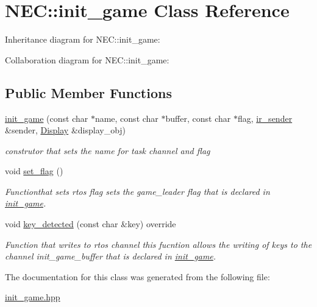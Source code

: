\hypertarget{classNEC_1_1init__game}{}\section{N\+EC\+:\+:init\+\_\+game Class Reference}
\label{classNEC_1_1init__game}


Inheritance diagram for N\+EC\+:\+:init\+\_\+game\+:


Collaboration diagram for N\+EC\+:\+:init\+\_\+game\+:
\subsection*{Public Member Functions}
\begin{DoxyCompactItemize}
\item 
\mbox{\label{classNEC_1_1init__game_ace52a0caaa9e8c08ae366183a1b3769e}} 
\hyperlink{classNEC_1_1init__game_ace52a0caaa9e8c08ae366183a1b3769e}{init\+\_\+game} (const char $\ast$name, const char $\ast$buffer, const char $\ast$flag, \hyperlink{classir__sender}{ir\+\_\+sender} \&sender, \hyperlink{classNEC_1_1Display}{Display} \&display\+\_\+obj)
\begin{DoxyCompactList}\small\item\em construtor that sets the name for task channel and flag \end{DoxyCompactList}\item 
\mbox{\label{classNEC_1_1init__game_a2ebec8672c32804fc405cd051c6d3a95}} 
void \hyperlink{classNEC_1_1init__game_a2ebec8672c32804fc405cd051c6d3a95}{set\+\_\+flag} ()
\begin{DoxyCompactList}\small\item\em Functionthat sets rtos flag  sets the game\+\_\+leader flag that is declared in \hyperlink{classNEC_1_1init__game}{init\+\_\+game}. \end{DoxyCompactList}\item 
\mbox{\label{classNEC_1_1init__game_aed110e01b7119b6b8327650d3efecf95}} 
void \hyperlink{classNEC_1_1init__game_aed110e01b7119b6b8327650d3efecf95}{key\+\_\+detected} (const char \&key) override
\begin{DoxyCompactList}\small\item\em Function that writes to rtos channel  this fucntion allows the writing of keys to the channel init\+\_\+game\+\_\+buffer that is declared in \hyperlink{classNEC_1_1init__game}{init\+\_\+game}. \end{DoxyCompactList}\end{DoxyCompactItemize}


The documentation for this class was generated from the following file\+:\begin{DoxyCompactItemize}
\item 
\hyperlink{init__game_8hpp}{init\+\_\+game.\+hpp}\end{DoxyCompactItemize}
